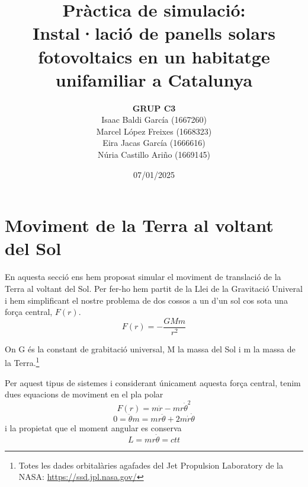 \documentclass[11pt]{article}
\title{\Huge\bfseries Pràctica de simulació: \\ Instal·lació de panells solars fotovoltaics en un habitatge unifamiliar a Catalunya \\ [2ex] \Large}
\author{\begin{tabular}{c}
\textbf{GRUP C3} \\
Isaac Baldi García (1667260)\\
Marcel López Freixes (1668323) \\
Eira Jacas García (1666616) \\
Núria Castillo Ariño (1669145)
\end{tabular}}
\date{07/01/2025}
\begin{document}
\maketitle
\newpage

\tableofcontents
\newpage

\section{Moviment de la Terra al voltant del Sol} \label{sec: seccio_1}
En aquesta secció ens hem proposat simular el moviment de translació de la Terra al voltant del Sol. Per fer-ho hem partit de la Llei de la Gravitació Univeral i hem simplificant el nostre problema de dos cossos a un d'un sol cos sota una força central, $F(r)$.
\begin{equation}
    F(r)=-\frac{GMm}{r^2}
\end{equation}

On G és la constant de grabitació universal, M la massa del Sol i m la massa de la Terra.\footnote{Totes les dades orbitalàries agafades del Jet Propulsion Laboratory de la NASA: \url{https://ssd.jpl.nasa.gov/}}

Per aquest tipus de sistemes i considerant únicament aquesta força central, tenim dues equacions de moviment en el pla polar 
\begin{equation}
    F(r)=m\ddot{r}-mr{\dot{\theta}}^2
    \label{equ_en_r}
\end{equation}
\begin{equation}
    0=\ddot{\theta}m=mr\ddot{\theta}+2m\dot{r}\dot{\theta}
    \label{equ_en_theta}
\end{equation}
i la propietat que el moment angular es conserva
\begin{equation}
    L=mr\dot{\theta}=ctt
    \label{moment_angular}
\end{equation}
\end{document}
